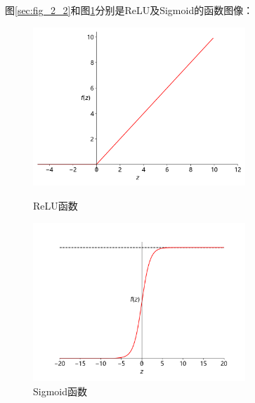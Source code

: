 图\ref{sec:fig_2_2}和图\ref{sec:fig_2_3}分别是ReLU及Sigmoid的函数图像：
\begin{figure}[!h]
	\centering
	\begin{minipage}[t]{0.48\textwidth}
		\centering
		\includegraphics[width=8cm]{figures/chapter_2/fig_2_2.png}
		\caption{ReLU函数}\label{sec:fig_2_2}
	\end{minipage}
	\begin{minipage}[t]{0.48\textwidth}
		\centering
		\includegraphics[width=8cm]{figures/chapter_2/fig_2_3.png}
		\caption{Sigmoid函数}\label{sec:fig_2_3}
	\end{minipage}
\end{figure}

